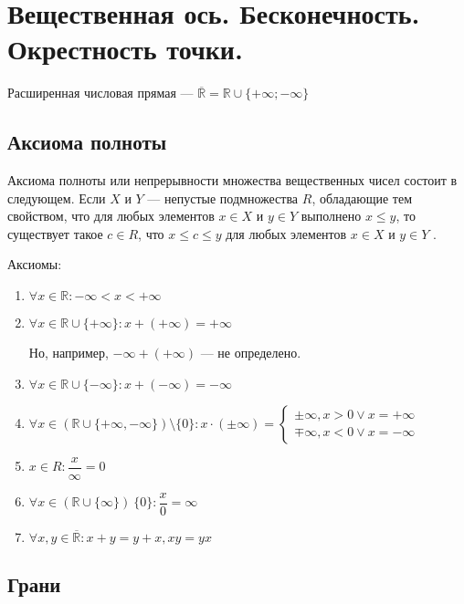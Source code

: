 \section{Вещественная ось. Бесконечность. Окрестность точки.}

Расширенная числовая прямая --- $\overline{\mathbb{R}} = \mathbb{R} \cup \{+\infty ;-\infty \}$

\subsection{Аксиома полноты}

Аксиома полноты или непрерывности множества вещественных чисел состоит в следующем.
Если $X$ и $Y$ — непустые подмножества $R$, обладающие тем свойством, что для любых элементов $x \in X$ и $y \in Y$ выполнено $x \le y$, то существует такое $c \in R$, что $x \le c \le y$ для любых элементов $x \in X$ и $y \in Y$ .

Аксиомы:

\begin{enumerate}
	\item $\forall x \in  \mathbb{R} : -\infty < x < +\infty$
	\item $\forall x \in  \mathbb{R} \cup \{+\infty \} : x + (+\infty)  = +\infty$
	
	Но, например, $-\infty + (+\infty)$ --- не определено.
	
	\item $\forall x \in  \mathbb{R} \cup \{-\infty \} : x + (-\infty) = -\infty$
	
	\item $\forall x \in \left( \mathbb{R} \cup \{+\infty, -\infty\}\right) \setminus \{0\} : x \cdot (\pm \infty) = \begin{cases}
		\pm \infty, x > 0 \lor x = + \infty \\
		\mp \infty, x < 0 \lor x = -\infty
	\end{cases}$
	
	\item $x \in R : \dfrac{x}{\infty} = 0$
	
	\item $\forall x \in \left( \mathbb{R} \cup \{\infty\} \right) \ \{0\} : \dfrac{x}{0} = \infty$

	\item $\forall x, y \in \overline{\mathbb{R}}: x + y = y + x, xy = yx$
	
\end{enumerate}

\subsection{Грани}

